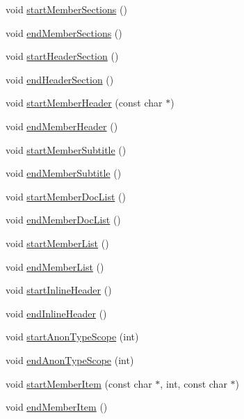\begin{DoxyCompactItemize}
\item 
void \hyperlink{class_latex_generator_a23972d083807cc9cb2c16c599724d3d1}{start\+Member\+Sections} ()
\item 
void \hyperlink{class_latex_generator_a11bd307d045459052bcc3e096bf4ecd5}{end\+Member\+Sections} ()
\item 
void \hyperlink{class_latex_generator_a5e472c9aacb7d71ac64c6d6c71fdf1a0}{start\+Header\+Section} ()
\item 
void \hyperlink{class_latex_generator_ac28872ad91e4d83b68a7a948b341c0d6}{end\+Header\+Section} ()
\item 
void \hyperlink{class_latex_generator_a5282254f8665289d08a7e8f1589f98c9}{start\+Member\+Header} (const char $\ast$)
\item 
void \hyperlink{class_latex_generator_aab0f11e3d9ce4eec99f4c9253e90d42c}{end\+Member\+Header} ()
\item 
void \hyperlink{class_latex_generator_a0fbe7f7867a9ba49681196d415c37a1a}{start\+Member\+Subtitle} ()
\item 
void \hyperlink{class_latex_generator_a1df0ae4d268f904add9bbfc67ee31797}{end\+Member\+Subtitle} ()
\item 
void \hyperlink{class_latex_generator_acc1d5f45c86faebbfa1e193aa6a9724a}{start\+Member\+Doc\+List} ()
\item 
void \hyperlink{class_latex_generator_a6e886d2519d4bfeff8d4023713ff59e5}{end\+Member\+Doc\+List} ()
\item 
void \hyperlink{class_latex_generator_a8c936a9bdcd8c892387318b3f947fb1e}{start\+Member\+List} ()
\item 
void \hyperlink{class_latex_generator_ae48dfc57c572fe5004850c809697f1c7}{end\+Member\+List} ()
\item 
void \hyperlink{class_latex_generator_a4f882c4c4f0b324aa4e8b90a3669f4e3}{start\+Inline\+Header} ()
\item 
void \hyperlink{class_latex_generator_acdfb80dc630e5257ba36c40a3a9e8c06}{end\+Inline\+Header} ()
\item 
void \hyperlink{class_latex_generator_a320eca9524c1041ffffcffc5784d2272}{start\+Anon\+Type\+Scope} (int)
\item 
void \hyperlink{class_latex_generator_a1f90504c74c14b0632ed5bf2bb4ef029}{end\+Anon\+Type\+Scope} (int)
\item 
void \hyperlink{class_latex_generator_acf2b05084bb0905ea84c4bfcc634cbee}{start\+Member\+Item} (const char $\ast$, int, const char $\ast$)
\item 
void \hyperlink{class_latex_generator_abc987c69dce26f3ae3b8b10aeb4e4ce6}{end\+Member\+Item} ()

\end{DoxyCompactItemize}
